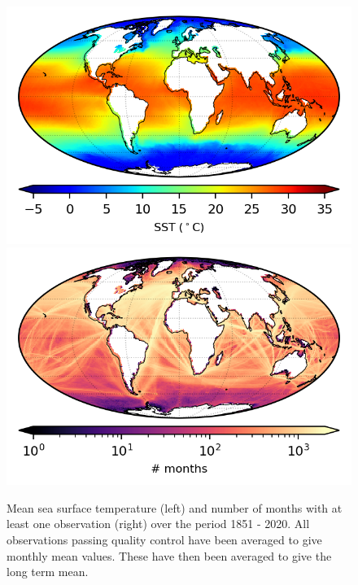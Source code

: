 \begin{figure}[h]
    \includegraphics{resources/observations-sst-mean-map-optimal.png}
    \includegraphics{resources/observations-sst-months-map-optimal.png}
    \caption{Mean sea surface temperature (left) and number of months with at least one observation (right) over the period 1851 - 2020. All observations passing quality control have been averaged to give monthly mean values. These have then been averaged to give the long term mean.}
    \label{fig:sst-map}
\end{figure}

\FloatBarrier
